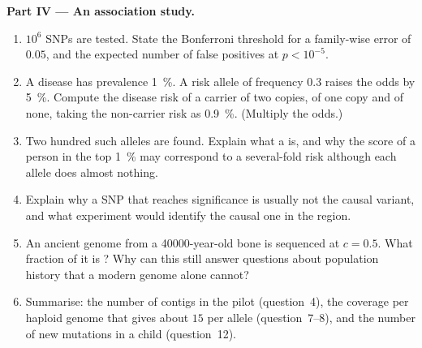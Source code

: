 \begin{problem}
\medskip
\noindent\textbf{Part IV --- An association study.}
\begin{enumerate}[resume]
  \item $10^{6}$ SNPs are tested. State the Bonferroni threshold for a
        family-wise error of $0.05$, and the expected number of false
        positives at $p < 10^{-5}$.
  \item A disease has prevalence \qty{1}{\%}. A risk allele of frequency
        $0.3$ raises the odds by \qty{5}{\%}. Compute the disease risk
        of a carrier of two copies, of one copy and of none, taking the
        non-carrier risk as \qty{0.9}{\%}. (Multiply the odds.)
  \item Two hundred such alleles are found. Explain what a  is, and why the score of a person in the top \qty{1}{\%}
        may correspond to a several-fold risk although each allele
        does almost nothing.
  \item Explain why a SNP that reaches significance is usually not the
        causal variant, and what experiment would identify the causal
        one in the region.
  \item An ancient genome from a \num{40000}-year-old bone is sequenced
        at $c = 0.5$. What fraction of it is ? Why can this still
        answer questions about population history that a modern genome
        alone cannot?
  \item Summarise: the number of contigs in the pilot 
        (question~4), the coverage per haploid genome that gives about
        $15$  per allele (question~7--8), and the number of new
        mutations in a child (question~12).
\end{enumerate}
\end{problem}
